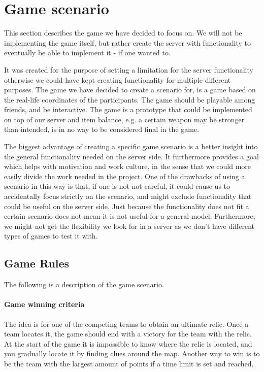 \section{Game scenario}\label{sec:game}

This section describes the game we have decided to focus on. We will not be implementing the game itself, but rather create the server with functionality to eventually be able to implement it - if one wanted to. 

It was created for the purpose of setting a limitation for the server functionality otherwise we could have kept creating functionality for multiple different purposes. The game we have decided to create a scenario for, is a game based on the real-life coordinates of the participants. The game should be playable among friends, and be interactive. The game is a prototype that could be implemented on top of our server and item balance, e.g. a certain weapon may be stronger than intended, is in no way to be considered final in the game.

The biggest advantage of creating a specific game scenario is a better insight into the general functionality needed on the server side. It furthermore provides a goal which helps with motivation and work culture, in the sense that we could more easily divide the work needed in the project. One of the drawbacks of using a scenario in this way is that, if one is not not careful, it could cause us to accidentally focus strictly on the scenario, and might exclude functionality that could be useful on the server side. Just because the functionality does not fit a certain scenario does not mean it is not useful for a general model. Furthermore, we might not get the flexibility we look for in a server as we don't have different types of games to test it with.

\subsection{Game Rules}\label{subsec:game-rules}

The following is a description of the game scenario.

\paragraph{Game winning criteria}
The idea is for one of the competing teams to obtain an ultimate relic. Once a team locates it, the game should end with a victory for the team with the relic. At the start of the game it is impossible to know where the relic is located, and you gradually locate it by finding clues around the map.
Another way to win is to be the team with the largest amount of points if a time limit is set and reached.

